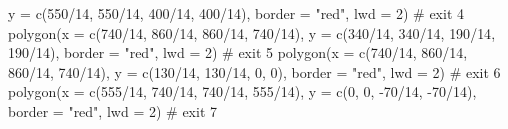 \documentclass[
  letterpaper,
  DIV=11,
  numbers=noendperiod]{scrreprt}
\newenvironment{Shaded}{\begin{snugshade}}{\end{snugshade}}
\newcommand{\AttributeTok}[1]{\textcolor[rgb]{0.40,0.45,0.13}{#1}}
\newcommand{\CommentTok}[1]{\textcolor[rgb]{0.37,0.37,0.37}{#1}}
\newcommand{\DecValTok}[1]{\textcolor[rgb]{0.68,0.00,0.00}{#1}}
\newcommand{\FunctionTok}[1]{\textcolor[rgb]{0.28,0.35,0.67}{#1}}
\newcommand{\NormalTok}[1]{\textcolor[rgb]{0.00,0.23,0.31}{#1}}
\newcommand{\SpecialCharTok}[1]{\textcolor[rgb]{0.37,0.37,0.37}{#1}}
\newcommand{\StringTok}[1]{\textcolor[rgb]{0.13,0.47,0.30}{#1}}
\begin{document}
\begin{Shaded}
\begin{Highlighting}[]
          \AttributeTok{y =} \FunctionTok{c}\NormalTok{(}\DecValTok{550}\SpecialCharTok{/}\DecValTok{14}\NormalTok{, }\DecValTok{550}\SpecialCharTok{/}\DecValTok{14}\NormalTok{, }\DecValTok{400}\SpecialCharTok{/}\DecValTok{14}\NormalTok{, }\DecValTok{400}\SpecialCharTok{/}\DecValTok{14}\NormalTok{),}
          \AttributeTok{border =} \StringTok{"red"}\NormalTok{,}
          \AttributeTok{lwd =} \DecValTok{2}\NormalTok{) }\CommentTok{\# exit 4}
  \FunctionTok{polygon}\NormalTok{(}\AttributeTok{x =} \FunctionTok{c}\NormalTok{(}\DecValTok{740}\SpecialCharTok{/}\DecValTok{14}\NormalTok{, }\DecValTok{860}\SpecialCharTok{/}\DecValTok{14}\NormalTok{, }\DecValTok{860}\SpecialCharTok{/}\DecValTok{14}\NormalTok{, }\DecValTok{740}\SpecialCharTok{/}\DecValTok{14}\NormalTok{),}
          \AttributeTok{y =} \FunctionTok{c}\NormalTok{(}\DecValTok{340}\SpecialCharTok{/}\DecValTok{14}\NormalTok{, }\DecValTok{340}\SpecialCharTok{/}\DecValTok{14}\NormalTok{, }\DecValTok{190}\SpecialCharTok{/}\DecValTok{14}\NormalTok{, }\DecValTok{190}\SpecialCharTok{/}\DecValTok{14}\NormalTok{),}
          \AttributeTok{border =} \StringTok{"red"}\NormalTok{,}
          \AttributeTok{lwd =} \DecValTok{2}\NormalTok{) }\CommentTok{\# exit 5}
  \FunctionTok{polygon}\NormalTok{(}\AttributeTok{x =} \FunctionTok{c}\NormalTok{(}\DecValTok{740}\SpecialCharTok{/}\DecValTok{14}\NormalTok{, }\DecValTok{860}\SpecialCharTok{/}\DecValTok{14}\NormalTok{, }\DecValTok{860}\SpecialCharTok{/}\DecValTok{14}\NormalTok{, }\DecValTok{740}\SpecialCharTok{/}\DecValTok{14}\NormalTok{),}
          \AttributeTok{y =} \FunctionTok{c}\NormalTok{(}\DecValTok{130}\SpecialCharTok{/}\DecValTok{14}\NormalTok{, }\DecValTok{130}\SpecialCharTok{/}\DecValTok{14}\NormalTok{, }\DecValTok{0}\NormalTok{, }\DecValTok{0}\NormalTok{),}
          \AttributeTok{border =} \StringTok{"red"}\NormalTok{,}
          \AttributeTok{lwd =} \DecValTok{2}\NormalTok{) }\CommentTok{\# exit 6}
  \FunctionTok{polygon}\NormalTok{(}\AttributeTok{x =} \FunctionTok{c}\NormalTok{(}\DecValTok{555}\SpecialCharTok{/}\DecValTok{14}\NormalTok{, }\DecValTok{740}\SpecialCharTok{/}\DecValTok{14}\NormalTok{, }\DecValTok{740}\SpecialCharTok{/}\DecValTok{14}\NormalTok{, }\DecValTok{555}\SpecialCharTok{/}\DecValTok{14}\NormalTok{),}
          \AttributeTok{y =} \FunctionTok{c}\NormalTok{(}\DecValTok{0}\NormalTok{, }\DecValTok{0}\NormalTok{, }\SpecialCharTok{{-}}\DecValTok{70}\SpecialCharTok{/}\DecValTok{14}\NormalTok{, }\SpecialCharTok{{-}}\DecValTok{70}\SpecialCharTok{/}\DecValTok{14}\NormalTok{),}
          \AttributeTok{border =} \StringTok{"red"}\NormalTok{,}
          \AttributeTok{lwd =} \DecValTok{2}\NormalTok{) }\CommentTok{\# exit 7}

\end{Highlighting}
\end{Shaded}
\end{document}
